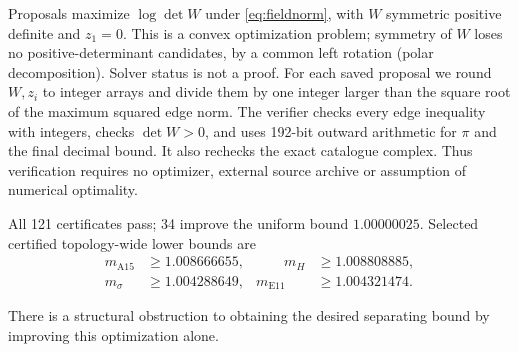 \documentclass[11pt,a4paper]{report}
\begin{document}
Proposals maximize $\log\det W$ under \eqref{eq:fieldnorm}, with
$W$ symmetric positive definite and $z_1=0$. This is a convex optimization
problem; symmetry of $W$ loses no positive-determinant candidates, by a
common left rotation (polar decomposition). Solver status is not a proof.
For each saved proposal we round $W,z_i$ to integer arrays and divide them
by one integer larger than the square root of the maximum squared edge
norm. The verifier checks every edge inequality with integers, checks
$\det W>0$, and uses 192-bit outward arithmetic for $\pi$ and the final
decimal bound. It also rechecks the exact catalogue complex.
Thus verification requires no optimizer, external source archive or
assumption of numerical optimality.

All 121 certificates pass; 34 improve the uniform bound $1.00000025$.
Selected certified topology-wide lower bounds are
\[
 \begin{aligned}
 m_{\mathrm{A15}}&\geq1.008666655,&\qquad m_H&\geq1.008808885,\\
 m_\sigma&\geq1.004288649,& m_{\mathrm{E11}}&\geq1.004321474.
 \end{aligned}
\]

There is a structural obstruction to obtaining the desired separating
bound by improving this optimization alone.
\end{document}
